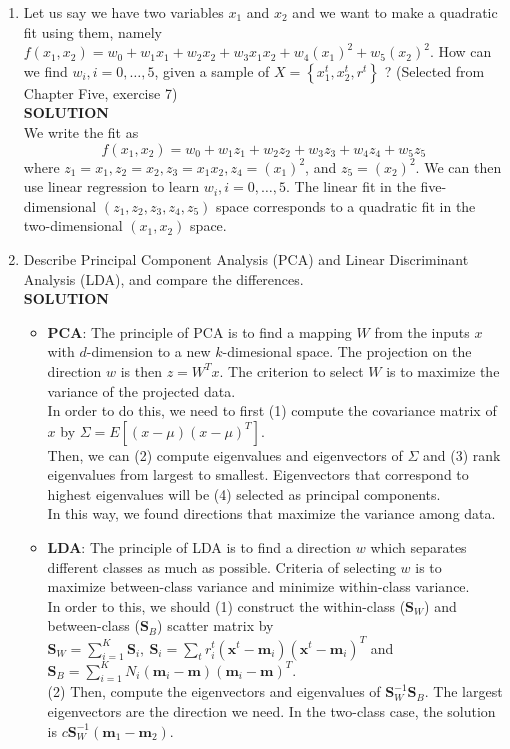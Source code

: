\documentclass{article}
\begin{document}
\begin{enumerate}
    \item Let us say we have two variables $x_1$ and $x_2$ and we want to make a quadratic fit using them,
    namely $f\left(x_1, x_2\right)=w_0+w_1 x_1+w_2 x_2+w_3 x_1 x_2+w_4\left(x_1\right)^2+w_5\left(x_2\right)^2$. How can we find $w_i, i=0, \ldots, 5$, given a sample of $X=\left\{x_1^t, x_2^t, r^t\right\}$ ? (Selected from Chapter Five, exercise 7)\\
\textbf{SOLUTION}\\
We write the fit as
$$
f\left(x_1, x_2\right)=w_0+w_1 z_1+w_2 z_2+w_3 z_3+w_4 z_4+w_5 z_5
$$
where $z_1=x_1, z_2=x_2, z_3=x_1 x_2, z_4=\left(x_1\right)^2$, and $z_5=\left(x_2\right)^2$. We can then use linear regression to learn $w_i, i=0, \ldots, 5$. The linear fit in the five-dimensional $\left(z_1, z_2, z_3, z_4, z_5\right)$ space corresponds to a quadratic fit in the two-dimensional $\left(x_1, x_2\right)$ space. 
    \item Describe Principal Component Analysis (PCA) and Linear Discriminant Analysis (LDA), and compare the differences.\\
    \textbf{SOLUTION}
    \begin{itemize}
        \item \textbf{PCA}: The principle of PCA is to find a mapping $W$ from the inputs $x$ with $d$-dimension to a new $k$-dimesional space. The projection on the direction $w$ is then $z=W^Tx$. The criterion to select $W$ is to maximize the variance of the projected data. \\
        In order to do this, we need to first (1) compute the covariance matrix of $x$ by $\Sigma = E\left[(x-\mu)(x-\mu)^T\right]$.\\
        Then, we can (2) compute eigenvalues and eigenvectors of $\Sigma$ and (3) rank eigenvalues from largest to smallest. Eigenvectors that correspond to highest eigenvalues will be (4) selected as principal components.\\
        In this way, we found directions that maximize the variance among data.

        \item \textbf{LDA}: The principle of LDA is to find a direction $w$ which separates different classes as much as possible. Criteria of selecting $w$ is to maximize between-class variance and minimize within-class variance.\\
        In order to this, we should (1) construct the within-class ($\mathbf{S}_W$) and between-class ($\mathbf{S}_B$) scatter matrix by $\mathbf{S}_W=\sum_{i=1}^K \boldsymbol{S}_i,~\mathbf{S}_i=\sum_t r_i^t\left(\boldsymbol{x}^t-\boldsymbol{m}_i\right)\left(\boldsymbol{x}^t-\boldsymbol{m}_i\right)^T$ and $\mathbf{S}_B=\sum_{i=1}^K N_i\left(\boldsymbol{m}_i-\boldsymbol{m}\right)\left(\boldsymbol{m}_i-\boldsymbol{m}\right)^T$.\\
        (2) Then, compute the eigenvectors and eigenvalues of $\mathbf{S}_W^{-1} \mathbf{S}_B$. The largest eigenvectors are the direction we need. In the two-class case, the solution is $c\boldsymbol{S}_W^{-1}(\boldsymbol{m}_1-\boldsymbol{m}_2)$.


\end{itemize}
\end{enumerate}
\end{document}
